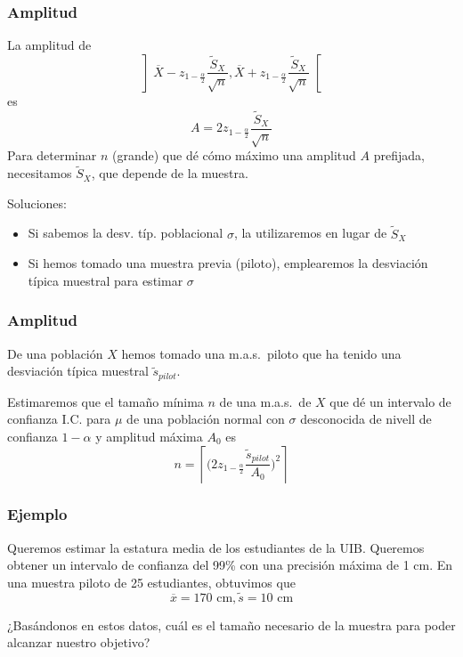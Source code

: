 \documentclass[12pt,t]{beamer}
\renewcommand{\emph}[1]{{\color{red}#1}}
\theoremstyle{plain}
\theoremstyle{definition}
\begin{document}
\begin{frame}
\frametitle{Amplitud}
\vspace*{-2ex}

La amplitud de 
$$
\left]\overline{X}-z_{1-\frac{\alpha}{2}}\frac{\widetilde{S}_X}{\sqrt{n}},
    \overline{X}+z_{1-\frac{\alpha}{2}}\frac{\widetilde{S}_X}{\sqrt{n}}\right[
$$
es
$$
A=2z_{1-\frac{\alpha}{2}}\frac{\widetilde{S}_X}{\sqrt{n}}
$$
Para determinar $n$ (grande) que dé cómo  máximo una amplitud $A$ prefijada, necesitamos $\widetilde{S}_X$, que depende de la muestra.
\medskip

 Soluciones:
\begin{itemize}
\item Si sabemos  la desv. típ. poblacional $\sigma$, la utilizaremos en lugar de  $\widetilde{S}_X$
\item Si hemos tomado una muestra previa (\emph{piloto}), emplearemos  la desviación típica muestral para estimar $\sigma$
\end{itemize}
\end{frame}



\begin{frame}
\frametitle{Amplitud}

\begin{block}{}
De una población $X$ hemos tomado una  \emph{m.a.s.\ piloto} que ha tenido una  desviación típica muestral $\widetilde{s}_{pilot}$.
\medskip

Estimaremos que el tamaño  mínima $n$ de una m.a.s.\ de $X$ que dé un intervalo de confianza  I.C. para $\mu$ de una población normal
con $\sigma$ desconocida de nivell de confianza  $1-\alpha$ y amplitud máxima $A_0$ es 
$$
n=\left\lceil \Big(2z_{1-\frac{\alpha}{2}}\frac{\widetilde{s}_{pilot}}{A_0}\Big)^2\right\rceil
$$
\end{block}



\end{frame}





\begin{frame}
\frametitle{Ejemplo}

Queremos  estimar la estatura media de los  estudiantes de la UIB. Queremos obtener un intervalo de confianza  del 99\% con 
una precisión máxima de 1 cm. En una muestra piloto de 25 estudiantes,  obtuvimos que  
$$
\overline{x} = 170\mbox{ cm}, \widetilde{s}=10\mbox{ cm}
$$

¿Basándonos en estos  datos, cuál es el tamaño necesario  de la muestra para poder alcanzar nuestro objetivo?

\end{frame}
\end{document}
